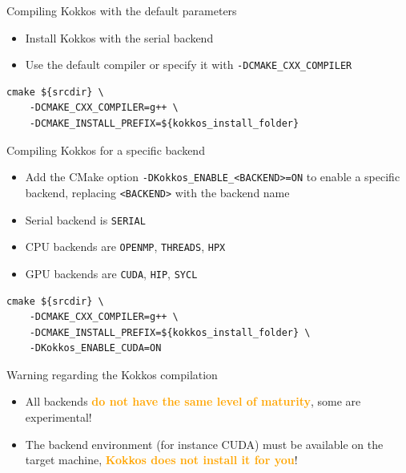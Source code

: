 \documentclass[aspectratio=169]{beamer}
\newcommand{\highlight}[1]{\textcolor{orange}{\textbf{#1}}}
\begin{document}

\begin{frame}[fragile]{Compiling Kokkos with the default parameters}
    \begin{itemize}
        \item Install Kokkos with the serial backend
        \item Use the default compiler or specify it with \texttt{-DCMAKE\_CXX\_COMPILER}
    \end{itemize}
    \begin{verbatim}
cmake ${srcdir} \
    -DCMAKE_CXX_COMPILER=g++ \
    -DCMAKE_INSTALL_PREFIX=${kokkos_install_folder}
    \end{verbatim}
\end{frame}


\begin{frame}[fragile]{Compiling Kokkos for a specific backend}
    \begin{itemize}
        \item Add the CMake option \texttt{-DKokkos\_ENABLE\_<BACKEND>=ON} to enable a specific backend, replacing \texttt{<BACKEND>} with the backend name
        \item Serial backend is \texttt{SERIAL}
        \item CPU backends are \texttt{OPENMP}, \texttt{THREADS}, \texttt{HPX}
        \item GPU backends are \texttt{CUDA}, \texttt{HIP}, \texttt{SYCL}
    \end{itemize}
    \begin{verbatim}
cmake ${srcdir} \
    -DCMAKE_CXX_COMPILER=g++ \
    -DCMAKE_INSTALL_PREFIX=${kokkos_install_folder} \
    -DKokkos_ENABLE_CUDA=ON
    \end{verbatim}
\end{frame}


\begin{frame}{Warning regarding the Kokkos compilation}
    \begin{itemize}
        \item All backends \highlight{do not have the same level of maturity}, some are experimental!
        \item The backend environment (for instance CUDA) must be available on the target machine, \highlight{Kokkos does not install it for you}!
    \end{itemize}
\end{frame}
\end{document}
